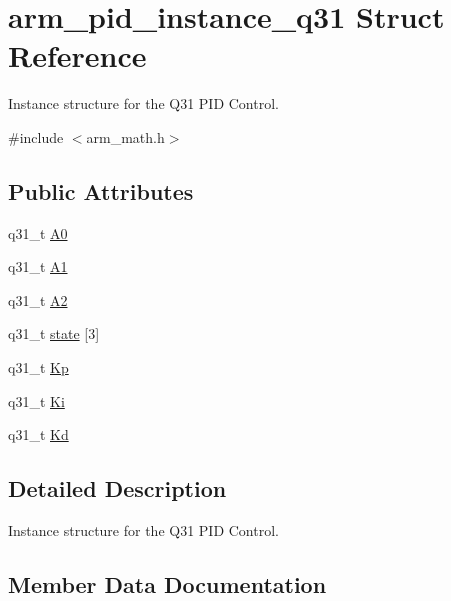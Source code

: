 \hypertarget{structarm__pid__instance__q31}{}\section{arm\+\_\+pid\+\_\+instance\+\_\+q31 Struct Reference}
\label{structarm__pid__instance__q31}


Instance structure for the Q31 P\+ID Control.  




{\ttfamily \#include $<$arm\+\_\+math.\+h$>$}

\subsection*{Public Attributes}
\begin{DoxyCompactItemize}
\item 
q31\+\_\+t \hyperlink{structarm__pid__instance__q31_aa5332635ce9c7078cdb4c1ecf442eadd}{A0}
\item 
q31\+\_\+t \hyperlink{structarm__pid__instance__q31_a2f7492bd6fb92fae5e2de7fbbec39b0e}{A1}
\item 
q31\+\_\+t \hyperlink{structarm__pid__instance__q31_a3e34537c53af4f9ad7bfffa4dff27c82}{A2}
\item 
q31\+\_\+t \hyperlink{structarm__pid__instance__q31_a228e4a64da6014844a0a671a1fa391d4}{state} \mbox{[}3\mbox{]}
\item 
q31\+\_\+t \hyperlink{structarm__pid__instance__q31_ac2410bf7f856d58dc1d773d4983cac8e}{Kp}
\item 
q31\+\_\+t \hyperlink{structarm__pid__instance__q31_aa861d69fd398f29aa0b4b455a823ed72}{Ki}
\item 
q31\+\_\+t \hyperlink{structarm__pid__instance__q31_aab4ff371d14441df501f1169f71cbd17}{Kd}
\end{DoxyCompactItemize}


\subsection{Detailed Description}
Instance structure for the Q31 P\+ID Control. 

\subsection{Member Data Documentation}
